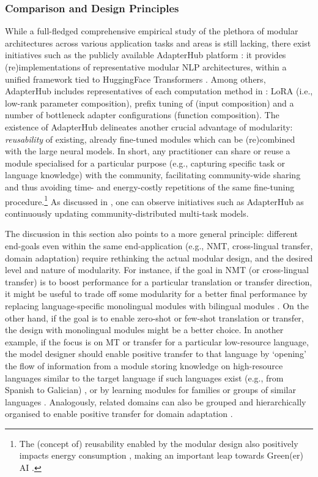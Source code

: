 \documentclass[10pt]{article} %
\begin{document}
\subsubsection{Comparison and Design Principles}
\label{sec:app_summary}
While a full-fledged comprehensive empirical study of the plethora of modular architectures across various application tasks and areas is still lacking, there exist initiatives such as the publicly available AdapterHub platform \citep{pfeiffer-etal-2020-adapterhub}: it provides (re)implementations of representative modular NLP architectures, within a unified framework tied to HuggingFace Transformers \citep{wolf2019huggingface}. Among others, AdapterHub includes representatives of each computation method in : LoRA \citep{hu2021lora} (i.e., low-rank parameter composition), prefix tuning of \cite{Li2020PrefixTuning} (input composition) and a number of bottleneck adapter configurations (function composition). 
The existence of AdapterHub delineates another crucial advantage of modularity: \textit{reusability} of existing, already fine-tuned modules which can be (re)combined with the large neural models. In short, any practitioner can share or reuse a module specialised for a particular purpose (e.g., capturing specific task or language knowledge) with the community, facilitating community-wide sharing and thus avoiding time- and energy-costly repetitions of the same fine-tuning procedure.\footnote{The (concept of) reusability enabled by the modular design also positively impacts energy consumption \citep{strubell-etal-2019-energy}, making an important leap towards Green(er) AI \citep{Schwartz:2020greenai}.} As discussed in , one can observe initiatives such as AdapterHub as continuously updating community-distributed multi-task models.

The discussion in this section also points to a more general principle: different end-goals even within the same end-application (e.g., NMT, cross-lingual transfer, domain adaptation) require rethinking the actual modular design, and the desired level and nature of modularity. For instance, if the goal in NMT (or cross-lingual transfer) is to boost performance for a particular translation or transfer direction, it might be useful to trade off some modularity for a better final performance by replacing language-specific monolingual modules with bilingual modules \citep{Bapna2019Adapters,Parovic2022BADX}. On the other hand, if the goal is to enable zero-shot or few-shot translation or transfer, the design with monolingual modules might be a better choice. In another example, if the focus is on MT or transfer for a particular low-resource language, the model designer should enable positive transfer to that language by `opening' the flow of information from a module storing knowledge on high-resource languages similar to the target language if such languages exist (e.g., from Spanish to Galician) \citep{ustun-etal-2021-multilingual}, or by learning modules for families or groups of similar languages \citep{Chronopolou:2022arxiv,Faisal:2022arxiv}. Analogously, related domains can also be grouped and hierarchically organised to enable positive transfer for domain adaptation \citep{Chronopoulou2022EfficientHierarchical}.
\end{document}
